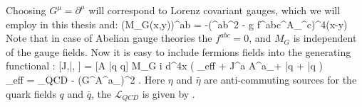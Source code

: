 	\eeqa
	Choosing $G^\mu = \partial^\mu$ will correspond to Lorenz covariant gauges, which we will employ in this thesis and: 
	\beqa
		\label{qcd_low:Gauge_matrix}
		(M_G(x,y))^{ab} = -(\delta^{ab}\partial^2 - g f^{abc}\partial^\mu A_\mu^c)\delta^4(x-y)
	\eeqa
	Note that in case of Abelian gauge theories the $f^{abc}=0$, and $M_G$ is independent of the gauge fields. Now it is easy to include fermions fields into the generating functional \Eq{\ref{qcd_low:Gen_functional_vec_2}}:
	\beqa
		\label{qcd_low:Gen_functional_vec_fer}
		[J,\bar \eta, \eta] = \int {} [A \bar q q] \;  M_G \;   \left\lbrace i \int d^4x \left( _{eff} + J^{a\mu} A^a_\mu + \bar q \eta + \bar \eta q \right)  \right\rbrace \;\; \\
		_{eff} = _{QCD} - (G^\mu A^a_\mu)^2 \;. \;\;\;\;\;\;\;\;\;\;\;\;\;\;\;\;\;\;\;\;\;\;\;\;\;\;\;\;\;\;\;\;\;\;\;\;
	\eeqa
	Here $\eta$ and $\bar \eta$ are anti-commuting sources for the quark fields $q$ and $\bar q$, the $\mathcal{L}_{QCD}$ is given by \Eq{\ref{qcd_low:L_QCD}}. \\
	
